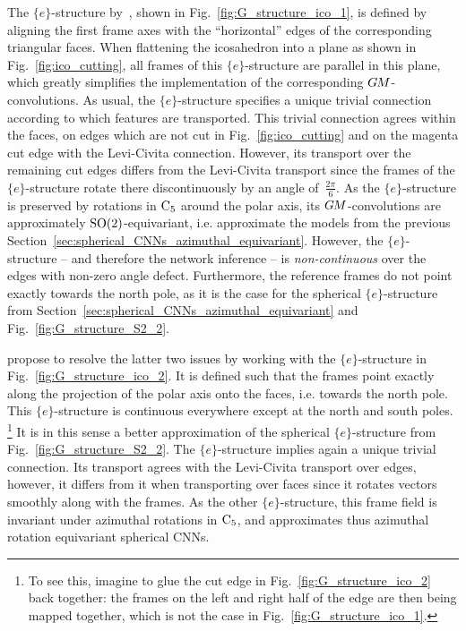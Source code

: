 The $\{e\}$-structure by~\citet{liu2018icoAltAz}, shown in Fig.~\ref{fig:G_structure_ico_1}, is defined by aligning the first frame axes with the ``horizontal'' edges of the corresponding triangular faces.
When flattening the icosahedron into a plane as shown in Fig.~\ref{fig:ico_cutting}, all frames of this $\{e\}$-structure are parallel in this plane, which greatly simplifies the implementation of the corresponding $G\mkern-1.4muM$-convolutions.
As usual, the $\{e\}$-structure specifies a unique trivial connection according to which features are transported.
This trivial connection agrees within the faces, on edges which are not cut in Fig.~\ref{fig:ico_cutting} and on the magenta cut edge with the Levi-Civita connection.
However, its transport over the remaining cut edges differs from the Levi-Civita transport since the frames of the $\{e\}$-structure rotate there discontinuously by an angle of~$\frac{2\pi}{6}$.
As the $\{e\}$-structure is preserved by rotations in $\operatorname{C}_{5}$ around the polar axis, its $G\mkern-1.4muM$-convolutions are approximately $\operatorname{SO}(2)$-equivariant, i.e. approximate the models from the previous Section~\ref{sec:spherical_CNNs_azimuthal_equivariant}.
However, the $\{e\}$-structure -- and therefore the network inference -- is \emph{non-continuous} over the edges with non-zero angle defect.
Furthermore, the reference frames do not point exactly towards the north pole, as it is the case for the spherical $\{e\}$-structure from Section~\ref{sec:spherical_CNNs_azimuthal_equivariant} and Fig.~\ref{fig:G_structure_S2_2}.


\citet{zhang2019orientation} propose to resolve the latter two issues by working with the $\{e\}$-structure in Fig.~\ref{fig:G_structure_ico_2}.
It is defined such that the frames point exactly along the projection of the polar axis onto the faces, i.e. towards the north pole.
This $\{e\}$-structure is continuous everywhere except at the north and south poles.%
\footnote{
    To see this, imagine to glue the cut edge in Fig.~\ref{fig:G_structure_ico_2} back together:
    the frames on the left and right half of the edge are then being mapped together, which is not the case in Fig.~\ref{fig:G_structure_ico_1}.
}
It is in this sense a better approximation of the spherical $\{e\}$-structure from Fig.~\ref{fig:G_structure_S2_2}.
The $\{e\}$-structure implies again a unique trivial connection.
Its transport agrees with the Levi-Civita transport over edges, however, it differs from it when transporting over faces since it rotates vectors smoothly along with the frames.
As the other $\{e\}$-structure, this frame field is invariant under azimuthal rotations in $\operatorname{C}_{5}$, and approximates thus azimuthal rotation equivariant spherical CNNs.


